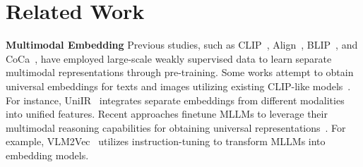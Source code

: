 \section{Related Work}

\noindent \textbf{Multimodal Embedding}
Previous studies, such as CLIP~\cite{CLIP}, Align~\cite{ALIGN}, BLIP~\cite{BLIP}, and CoCa~\cite{CoCa}, have employed large-scale weakly supervised data to learn separate multimodal representations through pre-training.
Some works attempt to obtain universal embeddings for texts and images utilizing existing CLIP-like models~\cite{UniIR, UniVL-DR, VISTA, MARVEL}.
For instance, UniIR~\cite{UniIR} integrates separate embeddings from different modalities into unified features.
Recent approaches finetune MLLMs to leverage their multimodal reasoning capabilities for obtaining universal representations~\cite{E5-V, MMEB, GME, megapairs, mmembed}.
For example, VLM2Vec~\cite{MMEB} utilizes instruction-tuning to transform MLLMs into embedding models.

